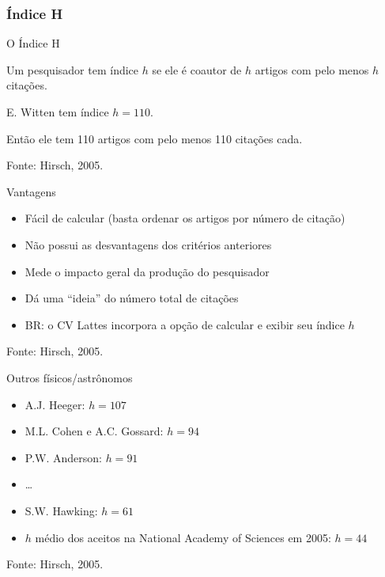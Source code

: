 \documentclass{beamer}
\begin{document}
\subsubsection{Índice H}

\begin{frame}{O Índice H}
  \begin{definition}
    Um pesquisador tem índice $h$ se ele é coautor de $h$ artigos com \alert{pelo menos} $h$ citações.
  \end{definition}
  \begin{example}
    E. Witten tem índice $h=110$.

    Então ele tem 110 artigos com pelo menos 110 citações cada.

  \end{example}

\vfill
Fonte: Hirsch, 2005.
\end{frame}

\begin{frame}{Vantagens}
  \begin{itemize}
  \item Fácil de calcular (basta ordenar os artigos por número de citação)
  \item Não possui as desvantagens dos critérios anteriores
  \item Mede o impacto geral da produção do pesquisador
  \item Dá uma ``ideia'' do número total de citações
  \item BR: o CV Lattes incorpora a opção de calcular e exibir seu índice $h$
  \end{itemize}

\vfill
Fonte: Hirsch, 2005.
\end{frame}

\begin{frame}{Outros físicos/astrônomos}
  \begin{itemize}
  \item<1-> A.J. Heeger: $h=107$
  \item<1-> M.L. Cohen e A.C. Gossard: $h=94$
  \item<1-> P.W. Anderson: $h=91$
  \item<1-> \ldots
  \item<1-> S.W. Hawking: $h=61$
  \item<2-> $h$ médio dos aceitos na National Academy of Sciences em 2005: $h=44$
  \end{itemize}

\vfill
Fonte: Hirsch, 2005.
\end{frame}
\end{document}
